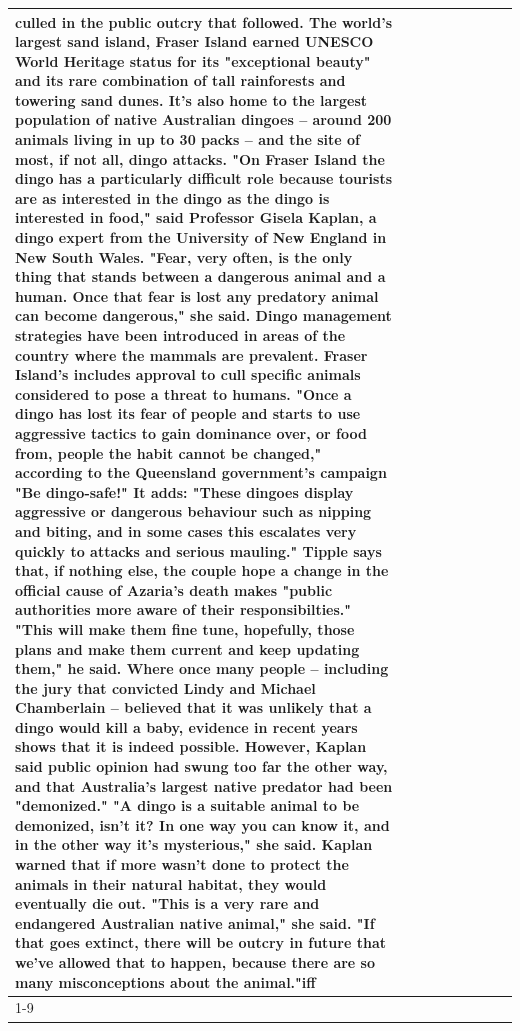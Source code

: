\begin{table}[H]
\begin{tabular}{lllrlllll}
culled in the public outcry that followed. The world's largest sand island, Fraser Island earned UNESCO World Heritage status for its "exceptional beauty" and its rare combination of tall rainforests and towering sand dunes. It's also home to the largest population of native Australian dingoes -- around 200 animals living in up to 30 packs -- and the site of most, if not all, dingo attacks. "On Fraser Island the dingo has a particularly difficult role because tourists are as interested in the dingo as the dingo is interested in food," said Professor Gisela Kaplan, a dingo expert from the University of New England in New South Wales. "Fear, very often, is the only thing that stands between a dangerous animal and a human. Once that fear is lost any predatory animal can become dangerous," she said. Dingo management strategies have been introduced in areas of the country where the mammals are prevalent. Fraser Island's includes approval to cull specific animals considered to pose a threat to humans. "Once a dingo has lost its fear of people and starts to use aggressive tactics to gain dominance over, or food from, people the habit cannot be changed," according to the Queensland government's campaign "Be dingo-safe!" It adds: "These dingoes display aggressive or dangerous behaviour such as nipping and biting, and in some cases this escalates very quickly to attacks and serious mauling." Tipple says that, if nothing else, the couple hope a change in the official cause of Azaria's death makes "public authorities more aware of their responsibilties." "This will make them fine tune, hopefully, those plans and make them current and keep updating them," he said. Where once many people -- including the jury that convicted Lindy and Michael Chamberlain -- believed that it was unlikely that a dingo would kill a baby, evidence in recent years shows that it is indeed possible. However, Kaplan said public opinion had swung too far the other way, and that Australia's largest native predator had been "demonized." "A dingo is a suitable animal to be demonized, isn't it? In one way you can know it, and in the other way it's mysterious," she said. Kaplan warned that if more wasn't done to protect the animals in their natural habitat, they would eventually die out. "This is a very rare and endangered Australian native animal," she said. "If that goes extinct, there will be outcry in future that we've allowed that to happen, because there are so many misconceptions about the animal."iff \\
\cline{1-9}

\end{tabular}
\end{table}
